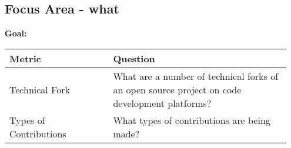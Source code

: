 
\subsection{Focus Area - what}
\textbf{Goal:} 
\begin{table}[ht!]
    \centering
    \begin{tabular}{|p{0.35\linewidth} | p{0.6\linewidth}|}
        \hline
        \hfil \textbf{Metric}  & \hfil \textbf{Question} \\
        \hline
		Technical Fork & What are a number of technical forks of an open source project on code development platforms? \\ 
		\hline
		Types of Contributions & What types of contributions are being made? \\ 
		\hline
    \end{tabular}
\end{table}
